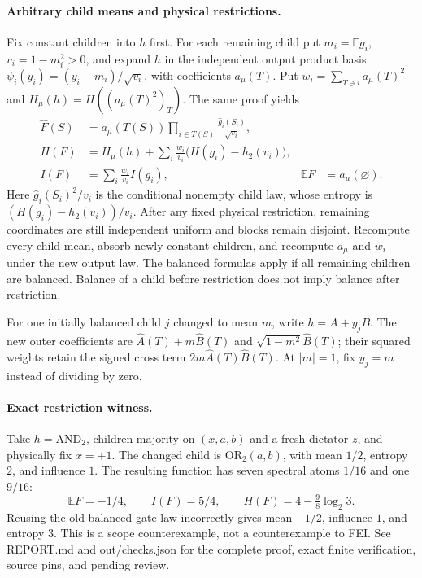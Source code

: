 \documentclass{article}
\begin{document}
\paragraph{Arbitrary child means and physical restrictions.}
Fix constant children into $h$ first. For each remaining child put
$m_i=\mathbb E g_i$, $v_i=1-m_i^2>0$, and expand $h$ in the independent
output product basis $\psi_i(y_i)=(y_i-m_i)/\sqrt{v_i}$, with coefficients
$a_\mu(T)$. Put $w_i=\sum_{T\ni i}a_\mu(T)^2$ and
$H_\mu(h)=H((a_\mu(T)^2)_T)$. The same proof yields
\begin{align*}
\widehat F(S)&=a_\mu(T(S))\prod_{i\in T(S)}
\frac{\widehat g_i(S_i)}{\sqrt{v_i}},\\
H(F)&=H_\mu(h)+\sum_i\frac{w_i}{v_i}\bigl(H(g_i)-h_2(v_i)\bigr),\\
I(F)&=\sum_i\frac{w_i}{v_i}I(g_i),&
\mathbb EF&=a_\mu(\varnothing).
\end{align*}
Here $\widehat g_i(S_i)^2/v_i$ is the conditional nonempty child law,
whose entropy is $(H(g_i)-h_2(v_i))/v_i$.
After any fixed physical restriction, remaining coordinates are still
independent uniform and blocks remain disjoint. Recompute every child
mean, absorb newly constant children, and recompute $a_\mu$ and $w_i$
under the new output law. The balanced formulas apply if all remaining
children are balanced. Balance of a child before restriction does not
imply balance after restriction.

For one initially balanced child $j$ changed to mean $m$, write
$h=A+y_jB$. The new outer coefficients are
$\widehat A(T)+m\widehat B(T)$ and
$\sqrt{1-m^2}\widehat B(T)$; their squared weights retain the signed
cross term $2m\widehat A(T)\widehat B(T)$. At $|m|=1$, fix $y_j=m$
instead of dividing by zero.

\paragraph{Exact restriction witness.}
Take $h=\mathrm{AND}_2$, children majority on $(x,a,b)$ and a fresh
dictator $z$, and physically fix $x=+1$. The changed child is
$\mathrm{OR}_2(a,b)$, with mean $1/2$, entropy $2$, and influence $1$.
The resulting function has seven spectral atoms $1/16$ and one $9/16$:
\[
\mathbb EF=-1/4,\qquad I(F)=5/4,\qquad
H(F)=4-\tfrac98\log_2 3.
\]
Reusing the old balanced gate law incorrectly gives mean $-1/2$,
influence $1$, and entropy $3$. This is a scope counterexample, not a
counterexample to FEI. See REPORT.md and out/checks.json for the complete
proof, exact finite verification, source pins, and pending review.
\end{document}
